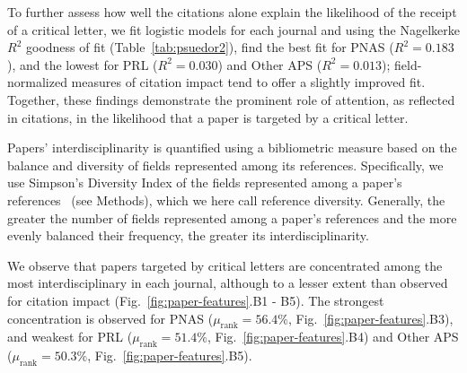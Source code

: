 \documentclass[12pt,a4paper]{article}
\numberwithin{equation}{section}
\def\methods{Methods}
\begin{document}
To further assess how well the citations alone explain the likelihood of the receipt of a critical letter, we fit logistic models for each journal and using the Nagelkerke $R^2$ goodness of fit (Table~\ref*{tab:psuedor2}), find the best fit for PNAS ($R^2 = 0.183$), and the lowest for PRL ($R^2 = 0.030$) and Other APS ($R^2 = 0.013$); 
field-normalized measures of citation impact tend to offer a slightly improved fit.
Together, these findings demonstrate the prominent role of attention, as reflected in citations, in the likelihood that a paper is targeted by a critical letter.


Papers' interdisciplinarity is quantified using a bibliometric measure based on the balance and diversity of fields represented among its references.
Specifically, we use Simpson's Diversity Index of the fields represented among a paper's references~\cite{chen_2015_interdisciplinary} (see \methods), which we here call reference diversity.
Generally, the greater the number of fields represented among a paper's references and the more evenly balanced their frequency, the greater its interdisciplinarity.

We observe that papers targeted by critical letters are concentrated among the most interdisciplinary in each journal, although to a lesser extent than observed for citation impact (Fig.~\ref*{fig:paper-features}.B1 - B5).
The strongest concentration is observed for PNAS ($\mu_{\text{rank}} = 56.4\%$, Fig.~\ref*{fig:paper-features}.B3), and weakest for PRL ($\mu_{\text{rank}} = 51.4\%$, Fig.~\ref*{fig:paper-features}.B4) and Other APS ($\mu_{\text{rank}} = 50.3\%$, Fig.~\ref*{fig:paper-features}.B5). 
\end{document}
